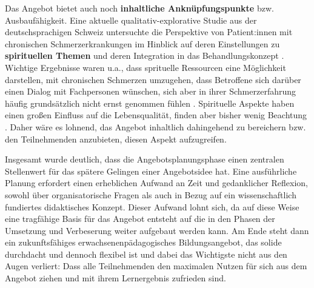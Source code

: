 \documentclass[
  twoside,
  parskip=half-,
  paper=176mm:246mm,
  BCOR=14mm,
  DIV=14,
]{scrreprt}
\begin{document}
Das Angebot bietet auch noch \textbf{inhaltliche Anknüpfungspunkte} bzw. Ausbaufähigkeit. Eine aktuelle qualitativ-explorative Studie aus der deutschsprachigen Schweiz untersuchte die Perspektive von Patient:innen mit chronischen Schmerzerkrankungen im Hinblick auf deren Einstellungen zu \textbf{spirituellen Themen} und deren Integration in das Behandlungskonzept \autocite[335]{HeftSchmerz5}. Wichtige Ergebnisse waren u.a., dass sprituelle Ressourcen eine Möglichkeit darstellen, mit chronischen Schmerzen umzugehen, dass Betroffene sich darüber einen Dialog mit Fachpersonen wünschen, sich aber in ihrer Schmerzerfahrung häufig grundsätzlich nicht ernst genommen fühlen \autocite[335]{HeftSchmerz5}. Spirituelle Aspekte haben einen großen Einfluss auf die Lebensqualität, finden aber bisher wenig Beachtung \autocite[vgl.][374]{fussnegger}. Daher wäre es lohnend, das Angebot inhaltlich dahingehend zu bereichern bzw. den Teilnehmenden anzubieten, diesen Aspekt aufzugreifen.

Insgesamt wurde deutlich, dass die Angebotsplanungsphase einen zentralen Stellenwert für das spätere Gelingen einer Angebotsidee hat. Eine ausführliche Planung erfordert einen erheblichen Aufwand an Zeit und gedanklicher Reflexion, sowohl über organisatorische Fragen als auch in Bezug auf ein wissenschaftlich fundiertes didaktisches Konzept. Dieser Aufwand lohnt sich, da auf diese Weise eine tragfähige Basis für das Angebot entsteht auf die in den Phasen der Umsetzung und Verbeserung weiter aufgebaut werden kann. Am Ende steht dann ein zukunftsfähiges erwachsenenpädagogisches Bildungsangebot, das solide durchdacht und dennoch flexibel ist und dabei das Wichtigste nicht aus den Augen verliert: Dass alle Teilnehmenden den maximalen Nutzen für sich aus dem Angebot ziehen und mit ihrem Lernergebnis zufrieden sind. 

\cleardoublepage
{}
\printbibliography[heading=bibintoc]

\cleardoublepage
{}

\listoffigures

\appendix

\end{document}

